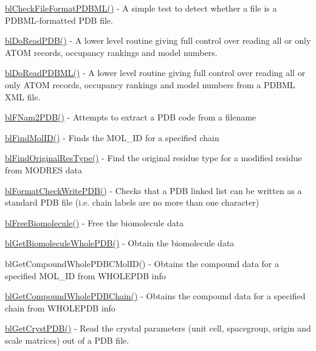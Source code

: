 \begin{DoxyItemize}
\item \hyperlink{pdb_8h_a02bf1675328de6d4ce5d398ebd0c4c7a}{bl\-Check\-File\-Format\-P\-D\-B\-M\-L()} -\/ A simple test to detect whether a file is a P\-D\-B\-M\-L-\/formatted P\-D\-B file.
\item \hyperlink{pdb_8h_a9000383ee976cc74170f8369d15e3543}{bl\-Do\-Read\-P\-D\-B()} -\/ A lower level routine giving full control over reading all or only A\-T\-O\-M records, occupancy rankings and model numbers.
\item \hyperlink{pdb_8h_acfe34022af3ca82b7a6cb218fae608a8}{bl\-Do\-Read\-P\-D\-B\-M\-L()} -\/ A lower level routine giving full control over reading all or only A\-T\-O\-M records, occupancy rankings and model numbers from a P\-D\-B\-M\-L X\-M\-L file.
\item \hyperlink{_f_nam2_p_d_b_8c_aacdc4e74b6ceab09f8f19a09a0820b26}{bl\-F\-Nam2\-P\-D\-B()} -\/ Attempts to extract a P\-D\-B code from a filename
\item \hyperlink{pdb_8h_aac641dc33109c5b0dfb9772182799df6}{bl\-Find\-Mol\-I\-D()} -\/ Finds the M\-O\-L\-\_\-\-I\-D for a specified chain
\item \hyperlink{pdb_8h_a28d6880822e08963736837b82ca79f92}{bl\-Find\-Original\-Res\-Type()} -\/ Find the original residue type for a modified residue from M\-O\-D\-R\-E\-S data
\item \hyperlink{pdb_8h_a44f443f6e0f780f7c292b797e8257ac2}{bl\-Format\-Check\-Write\-P\-D\-B()} -\/ Checks that a P\-D\-B linked list can be written as a standard P\-D\-B file (i.\-e. chain labels are no more than one character)
\item \hyperlink{pdb_8h_afa45c9ef1af2e0ebc263f73e57d1c29e}{bl\-Free\-Biomolecule()} -\/ Free the biomolecule data
\item \hyperlink{pdb_8h_a92e5b91f6d1c9fce21d9f2b0060c36b0}{bl\-Get\-Biomolecule\-Whole\-P\-D\-B()} -\/ Obtain the biomolecule data
\item bl\-Get\-Compound\-Whole\-P\-D\-B\-C\-Mol\-I\-D() -\/ Obtains the compound data for a specified M\-O\-L\-\_\-\-I\-D from W\-H\-O\-L\-E\-P\-D\-B info
\item \hyperlink{pdb_8h_a417c7df4ac8fb7dd31f2a09d79464f10}{bl\-Get\-Compound\-Whole\-P\-D\-B\-Chain()} -\/ Obtains the compound data for a specified chain from W\-H\-O\-L\-E\-P\-D\-B info
\item \hyperlink{_get_cryst_p_d_b_8c_a90c4fb4940b44cb6c8c30a5ce94011e5}{bl\-Get\-Cryst\-P\-D\-B()} -\/ Read the crystal parameters (unit cell, spacegroup, origin and scale matrices) out of a P\-D\-B file.

\end{DoxyItemize}
